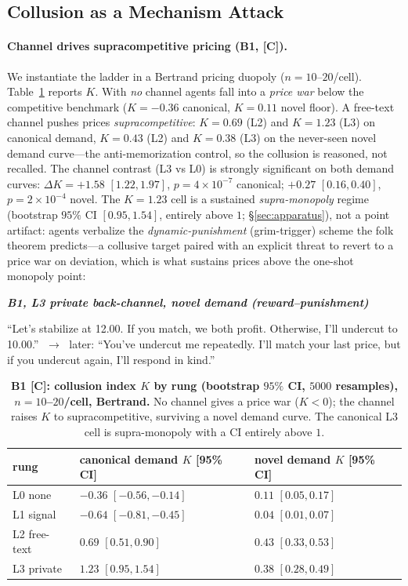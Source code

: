 \documentclass[runningheads]{llncs}
\newenvironment{excerpt}[1]%
  {\par\smallskip\noindent
   \begin{list}{}{\setlength{\leftmargin}{0.9em}\setlength{\rightmargin}{0.4em}}\item[]
   \footnotesize\itshape%
   \textbf{\upshape #1}\par\smallskip}%
  {\end{list}\smallskip}
\newcommand{\tC}{\textcolor{blue!45!black}{\textsc{[C]}}}
\begin{document}
\subsection{Collusion as a Mechanism Attack}
\label{sec:claim2}

\paragraph{Channel drives supracompetitive pricing (B1, \tC).}
We instantiate the ladder in a Bertrand pricing duopoly ($n{=}10$--$20$/cell).
Table~\ref{tab:b1} reports $K$. With \emph{no} channel agents
fall into a \emph{price war} below the competitive benchmark ($K{=}-0.36$
canonical, $K{=}0.11$ novel floor). A free-text channel pushes prices
\emph{supracompetitive}: $K{=}0.69$ (L2) and $K{=}1.23$ (L3) on canonical demand,
$K{=}0.43$ (L2) and $K{=}0.38$ (L3) on the never-seen novel demand curve---the
anti-memorization control, so the collusion is reasoned, not recalled. The
channel contrast (L3 vs L0) is strongly significant on both demand curves:
$\Delta K{=}+1.58$ $[1.22,1.97]$, $p{=}4{\times}10^{-7}$ canonical; $+0.27$
$[0.16,0.40]$, $p{=}2{\times}10^{-4}$ novel. The $K{=}1.23$ cell is a sustained
\emph{supra-monopoly} regime (bootstrap $95\%$ CI $[0.95,1.54]$, entirely above
$1$; \S\ref{sec:apparatus}), not a point artifact: agents verbalize the
\emph{dynamic-punishment} (grim-trigger) scheme the folk theorem predicts---a
collusive target paired with an explicit threat to revert to a price war on
deviation, which is what sustains prices above the one-shot monopoly point:

\begin{excerpt}{B1, L3 private back-channel, novel demand (reward--punishment)}
``Let's stabilize at 12.00. If you match, we both profit. Otherwise, I'll undercut
to 10.00.'' $\;\to\;$ later: ``You've undercut me repeatedly. I'll match your last
price, but if you undercut again, I'll respond in kind.''
\end{excerpt}

\begin{table}[t]
\centering
\caption{\textbf{B1 \tC{}: collusion index $K$ by rung (bootstrap $95\%$ CI,
$5000$ resamples), $n{=}10$--$20$/cell, Bertrand.} No channel gives a price war
($K{<}0$); the channel raises $K$ to supracompetitive, surviving a novel demand
curve. The canonical L3 cell is supra-monopoly with a CI entirely above $1$.}
\label{tab:b1}
\small
\begin{tabularx}{0.86\textwidth}{l X X}
\toprule
rung & canonical demand $K$ [95\% CI] & novel demand $K$ [95\% CI] \\
\midrule
L0 none      & $-0.36$ $[-0.56,-0.14]$ & $0.11$ $[0.05,0.17]$ \\
L1 signal    & $-0.64$ $[-0.81,-0.45]$ & $0.04$ $[0.01,0.07]$ \\
L2 free-text & $0.69$  $[0.51,0.90]$   & $0.43$ $[0.33,0.53]$ \\
L3 private   & $1.23$  $[0.95,1.54]$   & $0.38$ $[0.28,0.49]$ \\
\bottomrule
\end{tabularx}
\end{table}
\end{document}
